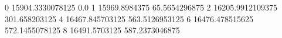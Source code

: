 0 15904.3330078125 0.0
1 15969.8984375 65.5654296875
2 16205.9912109375 301.658203125
4 16467.845703125 563.5126953125
6 16476.478515625 572.1455078125
8 16491.5703125 587.2373046875
